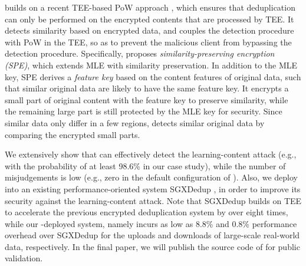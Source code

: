 \sysnameF builds on a recent TEE-based PoW approach \cite{ren21}, which ensures that deduplication can only be performed on the encrypted contents that are processed by TEE. It detects similarity based on encrypted data, and couples the detection procedure with PoW in the TEE, so as to prevent the malicious client from bypassing the detection procedure. Specifically, \sysnameF proposes {\em similarity-preserving encryption (SPE)}, which extends MLE with similarity preservation.
In addition to the MLE key, SPE derives a {\em feature key} based on the content features of original data, such that similar original data are likely to have the same feature key.
It encrypts a small part of original content with the feature key to preserve similarity, while the remaining large part is still protected by the MLE key for security.
Since similar data only differ in a few regions, \sysnameF detects similar original data by comparing the encrypted small parts.


We extensively show that \sysnameF can effectively detect the learning-content attack (e.g., with the probability of at least 98.6\% in our case study), while the number of misjudgements is low (e.g., zero in the default configuration of \sysnameF). Also, we deploy \sysnameF into an existing performance-oriented system SGXDedup \cite{ren21}, in order to improve its security against the learning-content attack. Note that SGXDedup builds on TEE to accelerate the previous encrypted deduplication system \cite{bellare13b} by over eight times, while our \sysnameF-deployed system, namely \prototype incurs as low as 8.8\% and 0.8\% performance overhead over SGXDedup for the uploads and downloads of large-scale real-world data, respectively.
In the final paper, we will publish the source code of \prototype for public validation.




